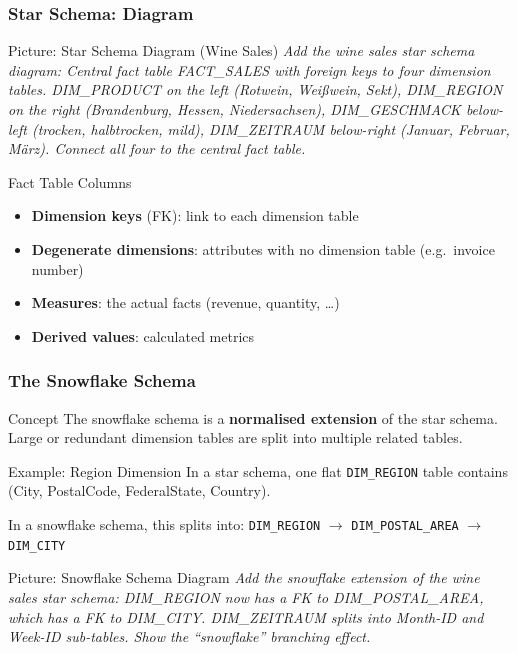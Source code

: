 \begin{frame}
  \frametitle{Star Schema: Diagram}

  \begin{alertblock}{Picture: Star Schema Diagram (Wine Sales)}
    \textit{Add the wine sales star schema diagram:
    Central fact table FACT\_SALES with foreign keys to four dimension tables.
    DIM\_PRODUCT on the left (Rotwein, Weißwein, Sekt),
    DIM\_REGION on the right (Brandenburg, Hessen, Niedersachsen),
    DIM\_GESCHMACK below-left (trocken, halbtrocken, mild),
    DIM\_ZEITRAUM below-right (Januar, Februar, März).
    Connect all four to the central fact table.}
  \end{alertblock}

  \begin{block}{Fact Table Columns}
    \begin{itemize}
      \item \textbf{Dimension keys} (FK): link to each dimension table
      \item \textbf{Degenerate dimensions}: attributes with no dimension table
        (e.g.\ invoice number)
      \item \textbf{Measures}: the actual facts (revenue, quantity, \ldots)
      \item \textbf{Derived values}: calculated metrics
    \end{itemize}
  \end{block}
\end{frame}


\begin{frame}
  \frametitle{The Snowflake Schema}

  \begin{block}{Concept}
    The snowflake schema is a \textbf{normalised extension} of the star schema.
    Large or redundant dimension tables are split into multiple related tables.
  \end{block}

  \begin{examples}{Example: Region Dimension}
    In a star schema, one flat \texttt{DIM\_REGION} table contains
    (City, PostalCode, FederalState, Country).

    In a snowflake schema, this splits into:
    \texttt{DIM\_REGION} $\to$ \texttt{DIM\_POSTAL\_AREA} $\to$ \texttt{DIM\_CITY}
  \end{examples}

  \begin{alertblock}{Picture: Snowflake Schema Diagram}
    \textit{Add the snowflake extension of the wine sales star schema:
    DIM\_REGION now has a FK to DIM\_POSTAL\_AREA, which has a FK to DIM\_CITY.
    DIM\_ZEITRAUM splits into Month-ID and Week-ID sub-tables.
    Show the ``snowflake'' branching effect.}
  \end{alertblock}
\end{frame}

